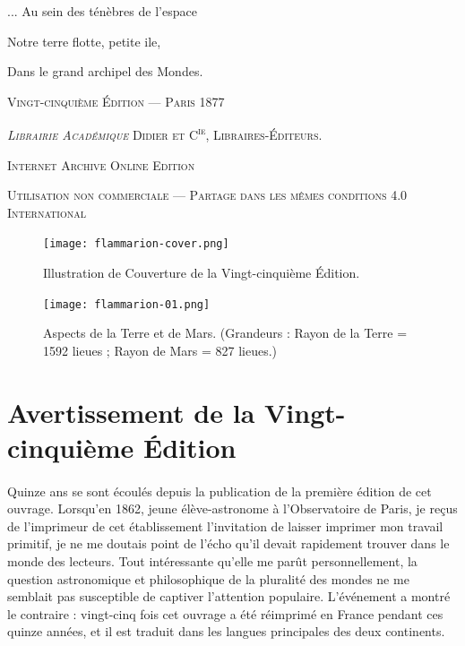 \documentclass[a4paper, 11pt, oneside]{article}
\begin{document}
\begin{titlepage}
        {\begin{flushright}
        \small
        ... Au sein des ténèbres de l'espace
        
        Notre terre flotte, petite ile,
        
        Dans le grand archipel des Mondes.
        \end{flushright}}

        \vspace*{\fill}

	\vspace{1\baselineskip}

	{\small\scshape Vingt-cinquième Édition --- Paris 1877}
	
	{\small\scshape{\emph{Librairie Académique} Didier et C\textsuperscript{ie}, Libraires-Éditeurs.}}
	
	\vspace{0.5\baselineskip} %

        \scshape Internet Archive Online Edition  %
	
	{\scshape\small Utilisation non commerciale --- Partage dans les mêmes conditions 4.0 International} %
\end{titlepage}
\pagestyle{fancy}
\fancyhf{}
\cfoot{\Fontauri{\thepage}}
\Large
\setlength{\parskip}{1mm plus1mm minus1mm}
\clearpage
\vspace*{\fill}
\begin{figure}[H]
\centering
\texttt{[image: flammarion-cover.png]}
\caption*{\Fontauri Illustration de Couverture de la Vingt-cinquième Édition.}
\end{figure}
\vspace*{\fill}
\clearpage
\tableofcontents
\clearpage
\vspace*{\fill}
\begin{figure}[H]
\centering
\texttt{[image: flammarion-01.png]}
\caption{\Fontauri Aspects de la Terre et de Mars. (Grandeurs : Rayon de la Terre = 1592 lieues ; Rayon de Mars = 827 lieues.)}
\end{figure}
\vspace*{\fill}
\clearpage
\section*{Avertissement de la Vingt-cinquième Édition}
\paragraph{}
Quinze ans se sont écoulés depuis la publication de la première édition de cet ouvrage. Lorsqu'en 1862, jeune élève-astronome à l'Observatoire de Paris, je reçus de l'imprimeur de cet établissement l'invitation de laisser imprimer mon travail primitif, je ne me doutais point de l'écho qu'il devait rapidement trouver dans le monde des lecteurs. Tout intéressante qu'elle me parût personnellement, la question astronomique et philosophique de la pluralité des mondes ne me semblait pas susceptible de captiver l'attention populaire. L'événement a montré le contraire : vingt-cinq fois cet ouvrage a été réimprimé en France pendant ces quinze années, et il est traduit dans les langues principales des deux continents.
\end{document}

